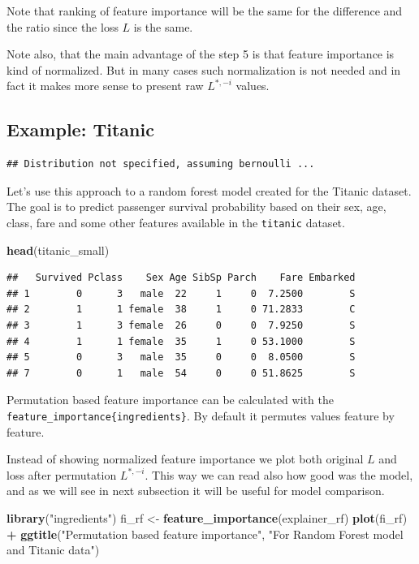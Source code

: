 \documentclass[]{krantz}
\newenvironment{Shaded}{\begin{snugshade}}{\end{snugshade}}
\newcommand{\KeywordTok}[1]{\textcolor[rgb]{0.13,0.29,0.53}{\textbf{#1}}}
\newcommand{\NormalTok}[1]{#1}
\newcommand{\OperatorTok}[1]{\textcolor[rgb]{0.81,0.36,0.00}{\textbf{#1}}}
\newcommand{\StringTok}[1]{\textcolor[rgb]{0.31,0.60,0.02}{#1}}
\theoremstyle{definition}
\theoremstyle{definition}
\theoremstyle{definition}
\theoremstyle{remark}
\begin{document}
Note that ranking of feature importance will be the same for the
difference and the ratio since the loss \(L\) is the same.

Note also, that the main advantage of the step 5 is that feature
importance is kind of normalized. But in many cases such normalization
is not needed and in fact it makes more sense to present raw
\(L^{*,-i}\) values.

\hypertarget{example-titanic}{%
\subsection{Example: Titanic}\label{example-titanic}}

\begin{verbatim}
## Distribution not specified, assuming bernoulli ...
\end{verbatim}

Let's use this approach to a random forest model created for the Titanic
dataset. The goal is to predict passenger survival probability based on
their sex, age, class, fare and some other features available in the
\texttt{titanic} dataset.

\begin{Shaded}
\begin{Highlighting}[]
\KeywordTok{head}\NormalTok{(titanic_small)}
\end{Highlighting}
\end{Shaded}

\begin{verbatim}
##   Survived Pclass    Sex Age SibSp Parch    Fare Embarked
## 1        0      3   male  22     1     0  7.2500        S
## 2        1      1 female  38     1     0 71.2833        C
## 3        1      3 female  26     0     0  7.9250        S
## 4        1      1 female  35     1     0 53.1000        S
## 5        0      3   male  35     0     0  8.0500        S
## 7        0      1   male  54     0     0 51.8625        S
\end{verbatim}

Permutation based feature importance can be calculated with the
\texttt{feature\_importance\{ingredients\}}. By default it permutes
values feature by feature.

Instead of showing normalized feature importance we plot both original
\(L\) and loss after permutation \(L^{*,-i}\). This way we can read also
how good was the model, and as we will see in next subsection it will be
useful for model comparison.

\begin{Shaded}
\begin{Highlighting}[]
\KeywordTok{library}\NormalTok{(}\StringTok{"ingredients"}\NormalTok{)}
\NormalTok{fi_rf <-}\StringTok{ }\KeywordTok{feature_importance}\NormalTok{(explainer_rf) }
\KeywordTok{plot}\NormalTok{(fi_rf) }\OperatorTok{+}\StringTok{ }\KeywordTok{ggtitle}\NormalTok{(}\StringTok{"Permutation based feature importance"}\NormalTok{, }\StringTok{"For Random Forest model and Titanic data"}\NormalTok{)}
\end{Highlighting}
\end{Shaded}
\end{document}
